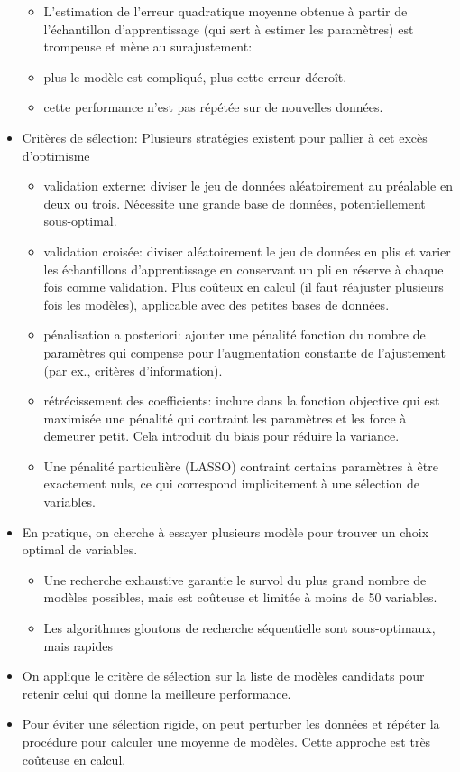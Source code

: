 \documentclass[
  11pt,
  letterpaper,
]{scrbook}
\providecommand{\tightlist}{%
  \setlength{\itemsep}{0pt}\setlength{\parskip}{0pt}}\usepackage{longtable,booktabs,array}
\theoremstyle{definition}
\theoremstyle{remark}
\begin{document}
\begin{tcolorbox}
\begin{itemize}
  \begin{itemize}
  \tightlist
  \item
    L'estimation de l'erreur quadratique moyenne obtenue à partir de
    l'échantillon d'apprentissage (qui sert à estimer les paramètres)
    est trompeuse et mène au surajustement:
  \item
    plus le modèle est compliqué, plus cette erreur décroît.
  \item
    cette performance n'est pas répétée sur de nouvelles données.
  \end{itemize}
\item
  Critères de sélection: Plusieurs stratégies existent pour pallier à
  cet excès d'optimisme

  \begin{itemize}
  \tightlist
  \item
    validation externe: diviser le jeu de données aléatoirement au
    préalable en deux ou trois. Nécessite une grande base de données,
    potentiellement sous-optimal.
  \item
    validation croisée: diviser aléatoirement le jeu de données en plis
    et varier les échantillons d'apprentissage en conservant un pli en
    réserve à chaque fois comme validation. Plus coûteux en calcul (il
    faut réajuster plusieurs fois les modèles), applicable avec des
    petites bases de données.
  \item
    pénalisation a posteriori: ajouter une pénalité fonction du nombre
    de paramètres qui compense pour l'augmentation constante de
    l'ajustement (par ex., critères d'information).
  \item
    rétrécissement des coefficients: inclure dans la fonction objective
    qui est maximisée une pénalité qui contraint les paramètres et les
    force à demeurer petit. Cela introduit du biais pour réduire la
    variance.
  \item
    Une pénalité particulière (LASSO) contraint certains paramètres à
    être exactement nuls, ce qui correspond implicitement à une
    sélection de variables.
  \end{itemize}
\item
  En pratique, on cherche à essayer plusieurs modèle pour trouver un
  choix optimal de variables.

  \begin{itemize}
  \tightlist
  \item
    Une recherche exhaustive garantie le survol du plus grand nombre de
    modèles possibles, mais est coûteuse et limitée à moins de 50
    variables.
  \item
    Les algorithmes gloutons de recherche séquentielle sont
    sous-optimaux, mais rapides
  \end{itemize}
\item
  On applique le critère de sélection sur la liste de modèles candidats
  pour retenir celui qui donne la meilleure performance.
\item
  Pour éviter une sélection rigide, on peut perturber les données et
  répéter la procédure pour calculer une moyenne de modèles. Cette
  approche est très coûteuse en calcul.
\end{itemize}


\end{tcolorbox}
\end{document}

